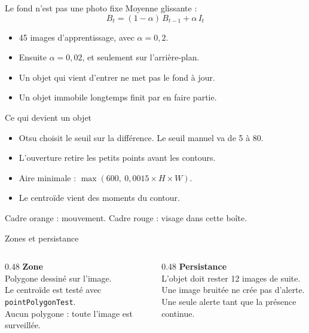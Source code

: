 \documentclass[11pt,aspectratio=169]{beamer}
\begin{document}
\begin{frame}{Le fond n'est pas une photo fixe}
  Moyenne glissante :
  \[
    B_t = (1-\alpha)\,B_{t-1} + \alpha\,I_t
  \]
  \begin{itemize}
    \item 45 images d'apprentissage, avec $\alpha = 0{,}2$.
    \item Ensuite $\alpha = 0{,}02$, et seulement sur l'arrière-plan.
    \item Un objet qui vient d'entrer ne met pas le fond à jour.
    \item Un objet immobile longtemps finit par en faire partie.
  \end{itemize}
\end{frame}

\begin{frame}{Ce qui devient un objet}
  \begin{itemize}
    \item Otsu choisit le seuil sur la différence. Le seuil manuel va de 5 à 80.
    \item L'ouverture retire les petits points avant les contours.
    \item Aire minimale : $\max(600,\ 0{,}0015 \times H \times W)$.
    \item Le centroïde vient des moments du contour.
  \end{itemize}
  \vspace{0.6em}
  Cadre orange : mouvement. Cadre rouge : visage dans cette boîte.
\end{frame}

\begin{frame}{Zones et persistance}
  \begin{columns}[T]
    \begin{column}{0.48\textwidth}
      \textbf{Zone}\\[0.4em]
      Polygone dessiné sur l'image.\\
      Le centroïde est testé avec \texttt{pointPolygonTest}.\\[0.4em]
      Aucun polygone : toute l'image est surveillée.
    \end{column}
    \begin{column}{0.48\textwidth}
      \textbf{Persistance}\\[0.4em]
      L'objet doit rester 12 images de suite.\\
      Une image bruitée ne crée pas d'alerte.\\
      Une seule alerte tant que la présence continue.
    \end{column}
  \end{columns}
\end{frame}
\end{document}
